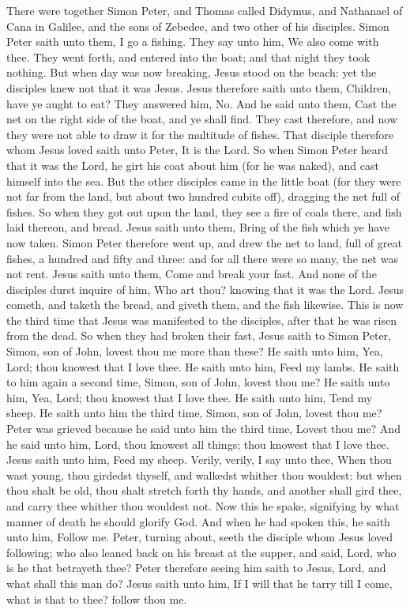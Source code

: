 There were together Simon Peter, and Thomas called Didymus, and Nathanael of Cana in Galilee, and the sons of Zebedee, and two other of his disciples. Simon Peter saith unto them, I go a fishing. They say unto him, We also come with thee. They went forth, and entered into the boat; and that night they took nothing. But when day was now breaking, Jesus stood on the beach: yet the disciples knew not that it was Jesus. Jesus therefore saith unto them, Children, have ye aught to eat? They answered him, No. And he said unto them, Cast the net on the right side of the boat, and ye shall find. They cast therefore, and now they were not able to draw it for the multitude of fishes. That disciple therefore whom Jesus loved saith unto Peter, It is the Lord. So when Simon Peter heard that it was the Lord, he girt his coat about him (for he was naked), and cast himself into the sea. But the other disciples came in the little boat (for they were not far from the land, but about two hundred cubits off), dragging the net full of fishes. So when they got out upon the land, they see a fire of coals there, and fish laid thereon, and bread. Jesus saith unto them, Bring of the fish which ye have now taken. Simon Peter therefore went up, and drew the net to land, full of great fishes, a hundred and fifty and three: and for all there were so many, the net was not rent. Jesus saith unto them, Come and break your fast. And none of the disciples durst inquire of him, Who art thou? knowing that it was the Lord. Jesus cometh, and taketh the bread, and giveth them, and the fish likewise. This is now the third time that Jesus was manifested to the disciples, after that he was risen from the dead.  So when they had broken their fast, Jesus saith to Simon Peter, Simon, son of John, lovest thou me more than these? He saith unto him, Yea, Lord; thou knowest that I love thee. He saith unto him, Feed my lambs. He saith to him again a second time, Simon, son of John, lovest thou me? He saith unto him, Yea, Lord; thou knowest that I love thee. He saith unto him, Tend my sheep. He saith unto him the third time, Simon, son of John, lovest thou me? Peter was grieved because he said unto him the third time, Lovest thou me? And he said unto him, Lord, thou knowest all things; thou knowest that I love thee. Jesus saith unto him, Feed my sheep. Verily, verily, I say unto thee, When thou wast young, thou girdedst thyself, and walkedst whither thou wouldest: but when thou shalt be old, thou shalt stretch forth thy hands, and another shall gird thee, and carry thee whither thou wouldest not. Now this he spake, signifying by what manner of death he should glorify God. And when he had spoken this, he saith unto him, Follow me. Peter, turning about, seeth the disciple whom Jesus loved following; who also leaned back on his breast at the supper, and said, Lord, who is he that betrayeth thee? Peter therefore seeing him saith to Jesus, Lord, and what shall this man do? Jesus saith unto him, If I will that he tarry till I come, what is that to thee? follow thou me. 